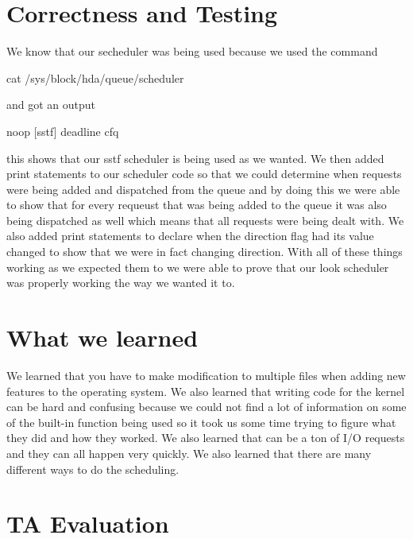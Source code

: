 \documentclass[letterpaper,10pt,titlepage]{article}
\begin{document}
\section{Correctness and Testing}
We know that our secheduler was being used because we used the command

cat /sys/block/hda/queue/scheduler

and got an output

noop [sstf] deadline cfq

this shows that our sstf scheduler is being used as we wanted. We then 
added print statements to our scheduler code so that we could determine 
when requests were being added and dispatched from the queue and by doing 
this we were able to show that for every requeust that was being added to 
the queue it was also being dispatched as well which means that all requests 
were being dealt with. We also added print statements to declare when the direction flag had its value changed to show that we were in fact changing direction. With all of these things 
working as we expected them to we were able to prove that our look 
scheduler was properly working the way we wanted it to. 

\section{What we learned}
We learned that you have to make modification to multiple files when adding 
new features to the operating system. We also learned that writing code for 
the kernel can be hard and confusing because we could not find a lot of 
information on some of the built-in function being used so it took us some 
time trying to figure what they did and how they worked. We also learned that 
can be a ton of I/O requests and they can all happen very quickly. We also 
learned that there are many different ways to do the scheduling. 

\section{TA Evaluation}
\end{document}
